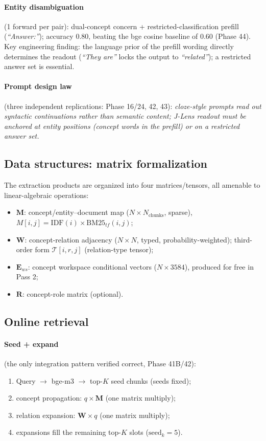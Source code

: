 \paragraph{Entity disambiguation} (1 forward per pair): dual-concept concern +
restricted-classification prefill (\emph{``Answer:''}); accuracy 0.80, beating
the bge cosine baseline of 0.60 (Phase 44). Key engineering finding: the
language prior of the prefill wording directly determines the readout
(\emph{``They are''} locks the output to \emph{``related''}); a restricted
answer set is essential.

\paragraph{Prompt design law} (three independent replications: Phase 16/24, 42,
43): \emph{cloze-style prompts read out syntactic continuations rather than
semantic content; J-Lens readout must be anchored at entity positions (concept
words in the prefill) or on a restricted answer set.}

\subsection{Data structures: matrix formalization}
\label{sec:method:matrix}

The extraction products are organized into four matrices/tensors, all amenable
to linear-algebraic operations:
\begin{itemize}
\item $\mathbf{M}$: concept/entity--document map ($N \times N_{\text{chunks}}$,
sparse), $M[i,j] = \mathrm{IDF}(i) \times \mathrm{BM25}_{tf}(i,j)$;
\item $\mathbf{W}$: concept-relation adjacency ($N \times N$, typed,
probability-weighted); third-order form $\mathcal{T}[i,r,j]$ (relation-type
tensor);
\item $\mathbf{E}_{ws}$: concept workspace conditional vectors
($N \times 3584$), produced for free in Pass 2;
\item $\mathbf{R}$: concept-role matrix (optional).
\end{itemize}

\subsection{Online retrieval}
\label{sec:method:online}

\paragraph{Seed + expand} (the only integration pattern verified correct,
Phase 41B/42):
\begin{enumerate}
\item Query $\to$ bge-m3 $\to$ top-$K$ seed chunks (seeds fixed);
\item concept propagation: $q \times \mathbf{M}$ (one matrix multiply);
\item relation expansion: $\mathbf{W} \times q$ (one matrix multiply);
\item expansions fill the remaining top-$K$ slots ($\text{seed}_k = 5$).
\end{enumerate}

